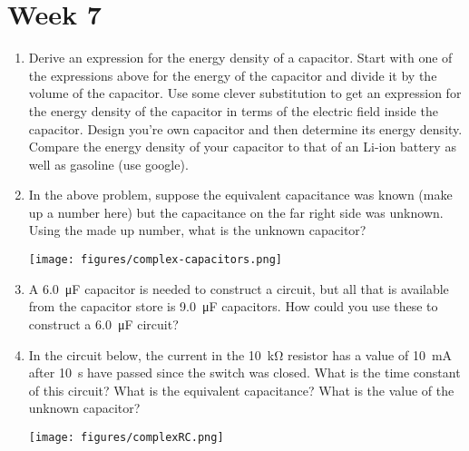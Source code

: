 \section*{Week 7}
\begin{enumerate}
\setlength\itemsep{2 in}
\setcounter{enumi}{\value{counter}}
\item Derive an expression for the energy density of a capacitor. Start with one of the expressions above for the energy of the capacitor and divide it by the volume of the capacitor. Use some clever substitution to get an expression for the energy density of the capacitor in terms of the electric field inside the capacitor. Design you're own capacitor and then determine its energy density. Compare the energy density of your capacitor to that of an Li-ion battery as well as gasoline (use google). 


\item
In the above problem, suppose the equivalent capacitance was known (make up a number here) but the capacitance on the far right side was unknown. Using the made up number, what is the unknown capacitor?

\texttt{[image: figures/complex-capacitors.png]}


\item
A \SI{6.0}{\micro\farad} capacitor is needed to construct a circuit, but all that is available from the capacitor store is \SI{9.0}{\micro\farad} capacitors. How could you use these to construct a \SI{6.0}{\micro\farad} circuit?

\item
In the circuit below, the current in the \SI{10}{\kilo\ohm} resistor has a value of \SI{10}{\milli\ampere} after \SI{10}{\second} have passed since the switch was closed. What is the time constant of this circuit? What is the equivalent capacitance? What is the value of the unknown capacitor?

\texttt{[image: figures/complexRC.png]}


\setcounter{counter}{\value{enumi}}
\end{enumerate}

\newpage

\ %

\newpage